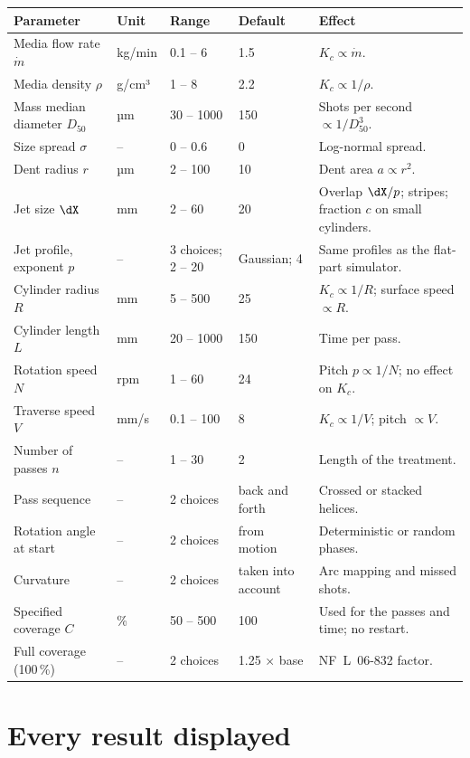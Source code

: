 \documentclass[11pt,a4paper]{article}
\begin{document}
\begin{longtable}{@{}p{3.6cm}p{1.4cm}p{2.0cm}p{1.7cm}p{4.8cm}@{}}
\toprule
\textbf{Parameter} & \textbf{Unit} & \textbf{Range} & \textbf{Default} & \textbf{Effect}\\ \midrule\endhead
Media flow rate $\dot m$ & kg/min & 0.1 -- 6 & 1.5 & $K_c\propto\dot m$.\\
Media density $\rho$ & g/cm³ & 1 -- 8 & 2.2 & $K_c\propto1/\rho$.\\
Mass median diameter $D_{50}$ & µm & 30 -- 1000 & 150 & Shots per second $\propto1/D_{50}^3$.\\
Size spread $\sigma$ & -- & 0 -- 0.6 & 0 & Log-normal spread.\\
Dent radius $r$ & µm & 2 -- 100 & 10 & Dent area $a\propto r^2$.\\
Jet size $\dX$ & mm & 2 -- 60 & 20 & Overlap $\dX/p$; stripes; fraction $c$ on small cylinders.\\
Jet profile, exponent $p$ & -- & 3 choices; 2 -- 20 & Gaussian; 4 & Same profiles as the flat-part simulator.\\
Cylinder radius $R$ & mm & 5 -- 500 & 25 & $K_c\propto1/R$; surface speed $\propto R$.\\
Cylinder length $L$ & mm & 20 -- 1000 & 150 & Time per pass.\\
Rotation speed $N$ & rpm & 1 -- 60 & 24 & Pitch $p\propto1/N$; no effect on $K_c$.\\
Traverse speed $V$ & mm/s & 0.1 -- 100 & 8 & $K_c\propto1/V$; pitch $\propto V$.\\
Number of passes $n$ & -- & 1 -- 30 & 2 & Length of the treatment.\\
Pass sequence & -- & 2 choices & back and forth & Crossed or stacked helices.\\
Rotation angle at start & -- & 2 choices & from motion & Deterministic or random phases.\\
Curvature & -- & 2 choices & taken into account & Arc mapping and missed shots.\\
Specified coverage $C$ & \% & 50 -- 500 & 100 & Used for the passes and time; no restart.\\
Full coverage (100\,\%) & -- & 2 choices & 1.25 × base & NF~L~06-832 factor.\\
\bottomrule
\end{longtable}

\section{Every result displayed}
\end{document}
